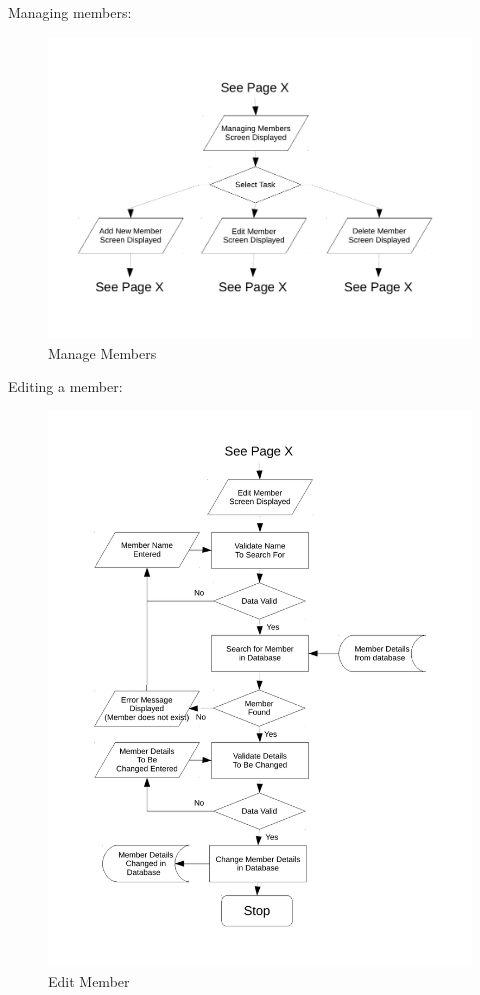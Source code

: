 Managing members:
\begin{figure}[H]
\includegraphics[width=\textwidth]{./Design/images/FC_manage_members.pdf}
    \caption{Manage Members} \label{fig:Flow Chart Manage Members}
\end{figure}

Editing a member:
\begin{figure}[H]
\includegraphics[width=\textwidth]{./Design/images/FC_edit_member.pdf}
    \caption{Edit Member} \label{fig:Flow Chart Edit Member}
\end{figure}

